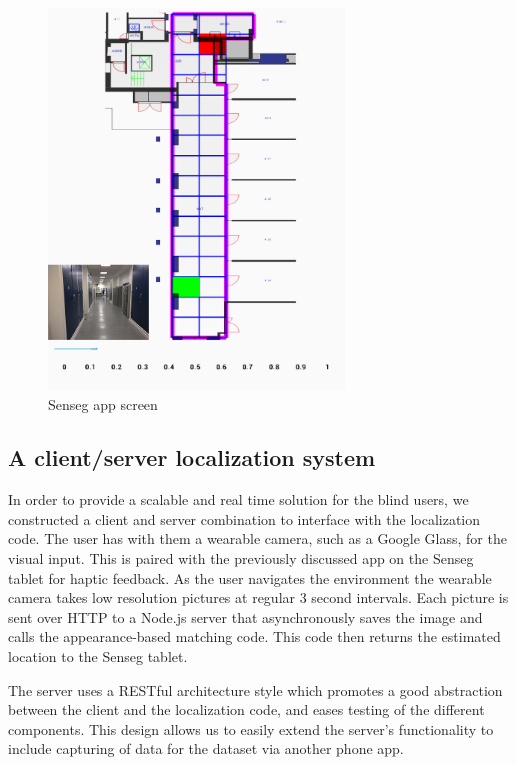 \begin{figure}[t]
\centering
\includegraphics[width = 0.7\textwidth]{gfx/Chapter06/screen.png}
\caption{Senseg app screen}
\label{fig:sensegscreen}
\end{figure}
 
\subsection{A client/server localization system}
\label{sec:5}

In order to provide a scalable and real time solution for the blind users, we constructed a client and server combination to interface with the localization code.
The user has with them a wearable camera, such as a Google Glass, for the visual input. This is paired with the previously discussed app on the Senseg tablet for haptic feedback.
As the user navigates the environment the wearable camera takes low resolution pictures at regular 3 second intervals.
Each picture is sent over HTTP to a Node.js server that asynchronously saves the image and calls the appearance-based matching code.
This code then returns the estimated location to the Senseg tablet.

The server uses a RESTful architecture style \citep{Fielding:2000:PDM:337180.337228} which promotes a good abstraction between the client and the localization code, and eases testing of the different components.
This design allows us to easily extend the server's functionality to include capturing of data for the dataset via another phone app.

